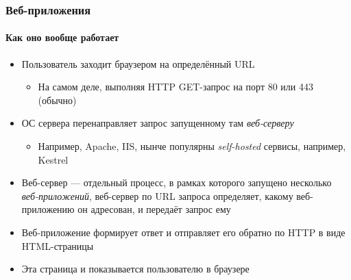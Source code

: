 \documentclass{../../slides-style}
\begin{document}
    \begin{frame}
        \frametitle{Веб-приложения}
        \framesubtitle{Как оно вообще работает}
        \begin{itemize}
            \item Пользователь заходит браузером на определённый URL
            \begin{itemize}
                \item На самом деле, выполняя HTTP GET-запрос на порт 80 или 443 (обычно)
            \end{itemize}
            \item ОС сервера перенаправляет запрос запущенному там \emph{веб-серверу}
            \begin{itemize}
                \item Например, Apache, IIS, нынче популярны \emph{self-hosted} сервисы, например, Kestrel
            \end{itemize}
            \item Веб-сервер --- отдельный процесс, в рамках которого запущено несколько \emph{веб-приложений}, веб-сервер по URL запроса определяет, какому веб-приложению он адресован, и передаёт запрос ему
            \item Веб-приложение формирует ответ и отправляет его обратно по HTTP в виде HTML-страницы
            \item Эта страница и показывается пользователю в браузере
        \end{itemize}
    \end{frame}
\end{document}

